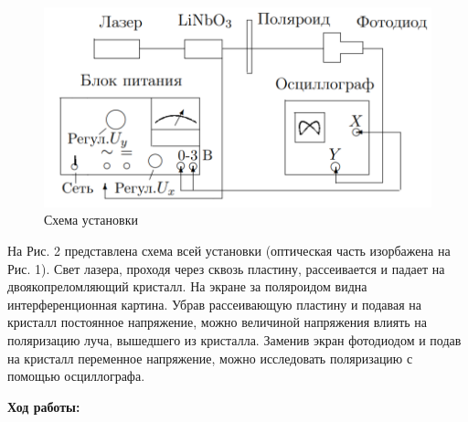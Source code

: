 \documentclass[a4paper, 12pt]{article}%
\begin{document}
	 \begin{figure}[h]
		\includegraphics[scale=0.7]{2.png}
		\centering
		\caption{Схема установки}
	\end{figure}
	
	На Рис. 2 представлена схема всей установки (оптическая часть изорбажена на Рис. 1). Свет лазера, проходя через сквозь пластину, рассеивается и падает на двоякопреломляющий кристалл. На экране за поляроидом видна интерференционная картина. Убрав рассеивающую пластину и подавая на кристалл постоянное напряжение, можно величиной напряжения влиять на поляризацию луча, вышедшего из кристалла. Заменив экран фотодиодом и подав на кристалл переменное напряжение, можно исследовать поляризацию с помощью осциллографа.\\
	
	\newpage
	
	\textbf{Ход работы: }\\
	
\end{document}
